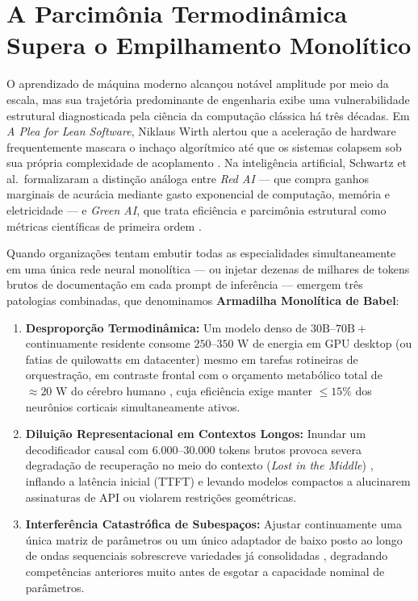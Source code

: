 \documentclass[10pt,a4paper]{article}
\begin{document}
\newpage
\tableofcontents
\newpage

\section{A Parcim\^onia Termodin\^amica Supera o Empilhamento Monol\'itico}

O aprendizado de m\'aquina moderno alcan\c{c}ou not\'avel amplitude por meio da escala, mas sua trajet\'oria predominante de engenharia exibe uma vulnerabilidade estrutural diagnosticada pela ci\^encia da computa\c{c}\~ao cl\'assica h\'a tr\^es d\'ecadas. Em \textit{A Plea for Lean Software}, Niklaus Wirth alertou que a acelera\c{c}\~ao de hardware frequentemente mascara o incha\c{c}o algor\'itmico at\'e que os sistemas colapsem sob sua pr\'opria complexidade de acoplamento \cite{wirth1995lean}. Na intelig\^encia artificial, Schwartz et al.\ formalizaram a distin\c{c}\~ao an\'aloga entre \textit{Red AI} --- que compra ganhos marginais de acur\'acia mediante gasto exponencial de computa\c{c}\~ao, mem\'oria e eletricidade --- e \textit{Green AI}, que trata efici\^encia e parcim\^onia estrutural como m\'etricas cient\'ificas de primeira ordem \cite{schwartz2020green}.

Quando organiza\c{c}\~oes tentam embutir todas as especialidades simultaneamente em uma \'unica rede neural monol\'itica --- ou injetar dezenas de milhares de tokens brutos de documenta\c{c}\~ao em cada prompt de infer\^encia --- emergem tr\^es patologias combinadas, que denominamos \textbf{Armadilha Monol\'itica de Babel}:
\begin{enumerate}
  \item \textbf{Despropor\c{c}\~ao Termodin\^amica:} Um modelo denso de $30\text{B}\text{--}70\text{B}+$ continuamente residente consome $250\text{--}350\text{ W}$ de energia em GPU desktop (ou fatias de quilowatts em datacenter) mesmo em tarefas rotineiras de orquestra\c{c}\~ao, em contraste frontal com o or\c{c}amento metab\'olico total de $\approx 20\text{ W}$ do c\'erebro humano \cite{kandel2021principles,attwell2001energy}, cuja efici\^encia exige manter $\le 15\%$ dos neur\^onios corticais simultaneamente ativos.
  \item \textbf{Dilui\c{c}\~ao Representacional em Contextos Longos:} Inundar um decodificador causal com $6.000\text{--}30.000$ tokens brutos provoca severa degrada\c{c}\~ao de recupera\c{c}\~ao no meio do contexto (\textit{Lost in the Middle}) \cite{liu2024lost}, inflando a lat\^encia inicial (TTFT) e levando modelos compactos a alucinarem assinaturas de API ou violarem restri\c{c}\~oes geom\'etricas.
  \item \textbf{Interfer\^encia Catastr\'ofica de Subespa\c{c}os:} Ajustar continuamente uma \'unica matriz de par\^ametros ou um \'unico adaptador de baixo posto ao longo de ondas sequenciais sobrescreve variedades j\'a consolidadas \cite{kirkpatrick2017ewc,chaudhry2018rwalk}, degradando compet\^encias anteriores muito antes de esgotar a capacidade nominal de par\^ametros.
\end{enumerate}
\end{document}
